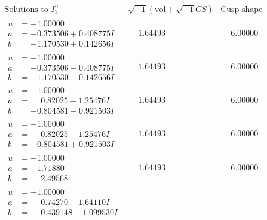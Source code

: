 \documentclass[1p]{elsarticle_modified}
\theoremstyle{definition}
\newcommand{\I}{\sqrt{-1}}
\begin{document}
$$\begin{array}{c|c|c}  
\text{Solutions to }I^u_{3}& \I (\text{vol} + \sqrt{-1}CS) & \text{Cusp shape}\\
 \hline 
\begin{aligned}
u &= -1.00000\phantom{ +0.000000I} \\
a &= -0.373506 + 0.408775 I \\
b &= -1.170530 + 0.142656 I\end{aligned}
 & \phantom{-}1.64493\phantom{ +0.000000I} & \phantom{-}6.00000\phantom{ +0.000000I} \\ \hline\begin{aligned}
u &= -1.00000\phantom{ +0.000000I} \\
a &= -0.373506 - 0.408775 I \\
b &= -1.170530 - 0.142656 I\end{aligned}
 & \phantom{-}1.64493\phantom{ +0.000000I} & \phantom{-}6.00000\phantom{ +0.000000I} \\ \hline\begin{aligned}
u &= -1.00000\phantom{ +0.000000I} \\
a &= \phantom{-}0.82025 + 1.25476 I \\
b &= -0.804581 - 0.921503 I\end{aligned}
 & \phantom{-}1.64493\phantom{ +0.000000I} & \phantom{-}6.00000\phantom{ +0.000000I} \\ \hline\begin{aligned}
u &= -1.00000\phantom{ +0.000000I} \\
a &= \phantom{-}0.82025 - 1.25476 I \\
b &= -0.804581 + 0.921503 I\end{aligned}
 & \phantom{-}1.64493\phantom{ +0.000000I} & \phantom{-}6.00000\phantom{ +0.000000I} \\ \hline\begin{aligned}
u &= -1.00000\phantom{ +0.000000I} \\
a &= -1.71880\phantom{ +0.000000I} \\
b &= \phantom{-}2.49568\phantom{ +0.000000I}\end{aligned}
 & \phantom{-}1.64493\phantom{ +0.000000I} & \phantom{-}6.00000\phantom{ +0.000000I} \\ \hline\begin{aligned}
u &= -1.00000\phantom{ +0.000000I} \\
a &= \phantom{-}0.74270 + 1.64110 I \\
b &= \phantom{-}0.439148 - 1.099530 I\end{aligned}

\end{array}$$
\end{document}
